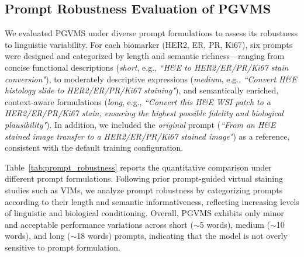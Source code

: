 \documentclass[journal,twoside,web]{ieeecolor}
\newcommand{\revision}[1]{\textcolor{revisioncolor}{#1}}  %
\renewcommand{\revision}[1]{#1}%
\begin{document}
\subsection{Prompt Robustness Evaluation of PGVMS}

{
We evaluated PGVMS under diverse prompt formulations to assess its robustness to linguistic variability. For each biomarker (HER2, ER, PR, Ki67), six prompts were designed and categorized by length and semantic richness—ranging from concise functional descriptions (\textit{short}, e.g., \textit{\revision{``H\&E to HER2/ER/PR/Ki67 stain conversion"}}), to moderately descriptive expressions (\textit{medium}, e.g., \textit{\revision{``Convert H\&E histology slide to HER2/ER/PR/Ki67 staining"}}), and semantically enriched, context-aware formulations (\textit{long}, e.g., \textit{\revision{``Convert this H\&E WSI patch to a HER2/ER/PR/Ki67 stain, ensuring the highest possible fidelity and biological plausibility"}}). In addition, we included the \textit{original} prompt (\textit{\revision{``From an H\&E stained image transfer to a HER2/ER/PR/Ki67 stained image"}}) as a reference, consistent with the default training configuration.
}


\revision{Table~\ref{tab:prompt_robustness} reports the quantitative comparison under different prompt formulations. 
Following prior prompt-guided virtual staining studies such as VIMs\cite{dubey2024vims}, we analyze prompt robustness by categorizing prompts according to their length and semantic informativeness, reflecting increasing levels of linguistic and biological conditioning. 
Overall, PGVMS exhibits only minor and acceptable performance variations across  short ($\sim$5 words), medium ($\sim$10 words), and long ($\sim$18 words) prompts, indicating that the model is not overly sensitive to prompt formulation.
}
\end{document}
